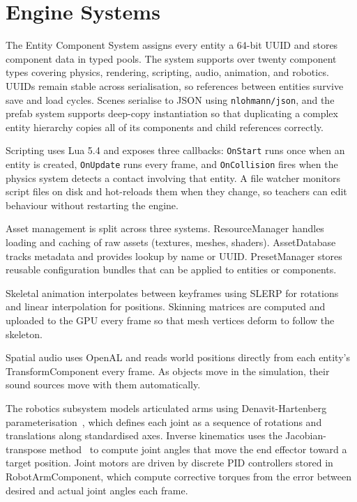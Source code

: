 \documentclass[9pt,openany]{extbook}
\begin{document}
\section{Engine Systems}

The Entity Component System assigns every entity a 64-bit UUID and stores component data in typed pools. The system supports over twenty component types covering physics, rendering, scripting, audio, animation, and robotics. UUIDs remain stable across serialisation, so references between entities survive save and load cycles. Scenes serialise to JSON using \texttt{nlohmann/json}, and the prefab system supports deep-copy instantiation so that duplicating a complex entity hierarchy copies all of its components and child references correctly.

Scripting uses Lua 5.4 and exposes three callbacks: \texttt{OnStart} runs once when an entity is created, \texttt{OnUpdate} runs every frame, and \texttt{OnCollision} fires when the physics system detects a contact involving that entity. A file watcher monitors script files on disk and hot-reloads them when they change, so teachers can edit behaviour without restarting the engine.

Asset management is split across three systems. ResourceManager handles loading and caching of raw assets (textures, meshes, shaders). AssetDatabase tracks metadata and provides lookup by name or UUID. PresetManager stores reusable configuration bundles that can be applied to entities or components.

Skeletal animation interpolates between keyframes using SLERP for rotations and linear interpolation for positions. Skinning matrices are computed and uploaded to the GPU every frame so that mesh vertices deform to follow the skeleton.

Spatial audio uses OpenAL and reads world positions directly from each entity's TransformComponent every frame. As objects move in the simulation, their sound sources move with them automatically.

The robotics subsystem models articulated arms using Denavit-Hartenberg parameterisation~\cite{denavit1955}, which defines each joint as a sequence of rotations and translations along standardised axes. Inverse kinematics uses the Jacobian-transpose method~\cite{buss2004ik} to compute joint angles that move the end effector toward a target position. Joint motors are driven by discrete PID controllers stored in RobotArmComponent, which compute corrective torques from the error between desired and actual joint angles each frame.
\end{document}
